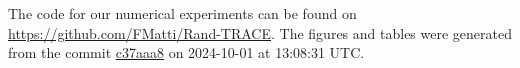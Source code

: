 The code for our numerical experiments can be found on \url{https://github.com/FMatti/Rand-TRACE}. The figures and tables were generated from the commit \href{https://github.com/FMatti/Rand-TRACE/tree/c37aaa8}{c37aaa8} on 2024-10-01 at 13:08:31 UTC.
